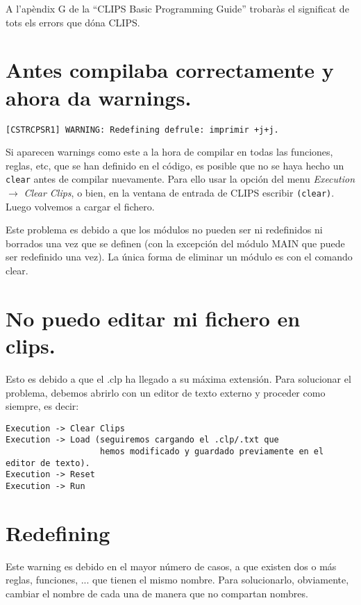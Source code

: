 \documentclass[11pt,svgnames]{scrbook}
\begin{document}
A l'apèndix G de la ``CLIPS Basic Programming Guide'' trobaràs el significat de tots els errors que dóna CLIPS.





\section{Antes compilaba correctamente y ahora da warnings.}

\texttt{[CSTRCPSR1] WARNING: Redefining defrule: imprimir +j+j.}

Si aparecen warnings como este a la hora de compilar en todas las funciones, reglas, etc, que se han
definido en el código, es posible que no se haya hecho un \texttt{clear} antes de compilar
nuevamente.
Para ello usar la opción del menu  \textit{Execution} $\rightarrow$ \textit{Clear Clips}, o bien, en
la ventana de entrada de CLIPS escribir  \texttt{(clear)}.
Luego volvemos a cargar el fichero.

Este problema es debido a que los módulos no pueden ser ni redefinidos ni borrados una vez que se definen (con la excepción del módulo MAIN que puede ser redefinido una vez). La única forma de eliminar un módulo es con el comando clear.


\section{No puedo editar mi fichero en clips.}

Esto es debido a que el .clp ha llegado a su máxima extensión. Para solucionar el problema, debemos abrirlo con un editor de texto externo y proceder como siempre, es decir:

\begin{verbatim}
Execution -> Clear Clips
Execution -> Load (seguiremos cargando el .clp/.txt que 
                   hemos modificado y guardado previamente en el editor de texto).
Execution -> Reset
Execution -> Run
\end{verbatim}

\section{Redefining}

Este warning es debido en el mayor número de casos, a que existen dos o más reglas, funciones, ... que tienen el mismo nombre. Para solucionarlo, obviamente, cambiar el nombre de cada una de manera que no compartan nombres.
\end{document}
